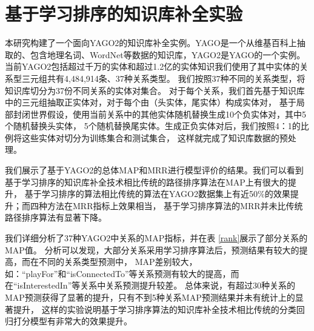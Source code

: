 \section{基于学习排序的知识库补全实验}
\label{cha:exp-relational}

本研究构建了一个面向YAGO2的知识库补全实例。YAGO是一个从维基百科上抽取的、包含地理名词、WordNet等数据的知识库，YAGO2是YAGO的一个实例。
当前YAGO2包括超过千万的实体和超过1.2亿的实体知识我们使用了其中实体的关系型三元组共有4,484,914条、37种关系类型。
我们按照37种不同的关系类型，将知识库切分为37份不同关系的实体对集合。
对于每个关系，我们首先基于知识库中的三元组抽取正实体对，对于每个由（头实体，尾实体）构成实体对，
基于局部封闭世界假设，使用当前关系中的其他实体随机替换生成10个负实体对，其中5个随机替换头实体，
5个随机替换尾实体。生成正负实体对后，我们按照4：1的比例将这些实体对切分为训练集合和测试集合，
这样就完成了知识库数据的预处理。

我们展示了基于YAGO2的总体MAP和MRR进行模型评价的结果。我们可以看到基于学习排序的知识库补全技术相比传统的路径排序算法在MAP上有很大的提升，
基于学习排序的算法相比传统的算法在YAGO2数据集上有近50\%的效果提升；而四种方法在MRR指标上效果相当，
基于学习排序算法的MRR并未比传统路径排序算法有显著下降。

我们详细分析了37种YAGO2中关系的MAP指标，并在表 \ref{rank}展示了部分关系的MAP值。
分析可以发现，大部分关系采用学习排序算法后，预测结果有较大的提高，而在不同的关系类型预测中，
MAP差别较大，如：“playFor”和“isConnectedTo”等关系预测有较大的提高，而在“isInterestedIn”等关系中关系预测提升较差。
总体来说，有超过30种关系的MAP预测获得了显著的提升，只有不到5种关系MAP预测结果并未有统计上的显著提升，
这样的实验说明基于学习排序算法的知识库补全技术相比传统的分类回归打分模型有非常大的效果提升。

